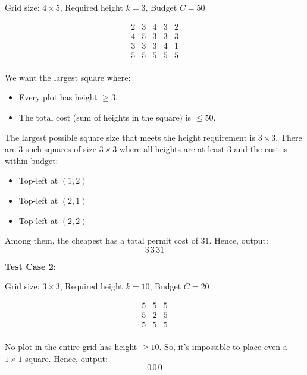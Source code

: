 \documentclass{article}
\begin{document}
Grid size: $4 \times 5$, Required height $k=3$, Budget $C=50$

\[
\begin{matrix}
2 & 3 & 4 & 3 & 2 \\
4 & 5 & 3 & 3 & 3 \\
3 & 3 & 3 & 4 & 1 \\
5 & 5 & 5 & 5 & 5 \\
\end{matrix}
\]

We want the largest square where: 
\begin{itemize}
    \item Every plot has height $\geq 3$.
    \item The total cost (sum of heights in the square) is $\leq 50$.
\end{itemize}

The largest possible square size that meets the height requirement is $3 \times 3$. There are 3 such squares of size $3 \times 3$ where all heights are at least 3 and the cost is within budget:
\begin{itemize}
    \item Top-left at $(1,2)$
    \item Top-left at $(2,1)$
    \item Top-left at $(2,2)$
\end{itemize}

Among them, the cheapest has a total permit cost of 31. Hence, output: 
\[
3 \, 3 \, 31
\]

\noindent \textbf{Test Case 2:}

Grid size: $3 \times 3$, Required height $k=10$, Budget $C=20$

\[
\begin{matrix}
5 & 5 & 5 \\
5 & 2 & 5 \\
5 & 5 & 5 \\
\end{matrix}
\]

No plot in the entire grid has height $\geq 10$. So, it’s impossible to place even a $1 \times 1$ square. Hence, output:
\[
0 \, 0 \, 0
\]
\end{document}
